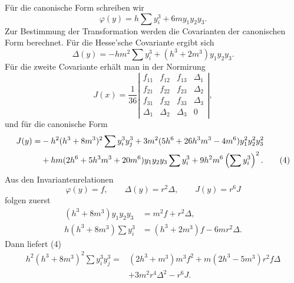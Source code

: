 \documentclass[11pt]{article}
\begin{document}
Für die canonische Form schreiben wir
\begin{equation}
 \varphi(y)=h\sum y_i^3+6my_1y_2y_3.
 \tag{1}
\end{equation}
Zur Bestimmung der Transformation werden die Covarianten der canonischen Form berechnet. Für die Hesse'sche Covariante ergibt sich
\begin{equation}
 \Delta(y)=-hm^2\sum y_i^3+(h^3+2m^3)y_1y_2y_3.
 \tag{2}
\end{equation}
Für die zweite Covariante erhält man in der Normirung
\begin{equation}
 J(x)=\frac1{36}
 \left|\begin{array}{cccc}
 f_{11}&f_{12}&f_{13}&\Delta_1\\
 f_{21}&f_{22}&f_{23}&\Delta_2\\
 f_{31}&f_{32}&f_{33}&\Delta_3\\
 \Delta_1&\Delta_2&\Delta_3&0
 \end{array}\right|,
 \tag{3}
\end{equation}
und für die canonische Form
\begin{align}
 J(y)=&-h^2(h^3+8m^3)^2\sum y_i^3y_j^3
      +3m^2(5h^6+26h^3m^3-4m^6)y_1^2y_2^2y_3^2\notag\\
 &+hm(2h^6+5h^3m^3+20m^6)y_1y_2y_3\sum y_i^3
      +9h^2m^6\left(\sum y_i^3\right)^2 .
 \tag{4}
\end{align}
Aus den Invariantenrelationen
\begin{equation}
 \varphi(y)=f,
 \qquad \Delta(y)=r^2\Delta,
 \qquad J(y)=r^6J
 \tag{5}
\end{equation}
folgen zuerst
\begin{align}
 (h^3+8m^3)y_1y_2y_3&=m^2f+r^2\Delta,
 \tag{6}\\
 h(h^3+8m^3)\sum y_i^3&=(h^3+2m^3)f-6mr^2\Delta.
 \tag{7}
\end{align}
Dann liefert (4)
\begin{equation}
\begin{aligned}
 h^2(h^3+8m^3)^2\sum y_i^3y_j^3={}&(2h^3+m^3)m^3f^2
 +m(2h^3-5m^3)r^2f\Delta\\
&+3m^2r^4\Delta^2-r^6J.
\end{aligned}
\tag{8}
\end{equation}
\end{document}
